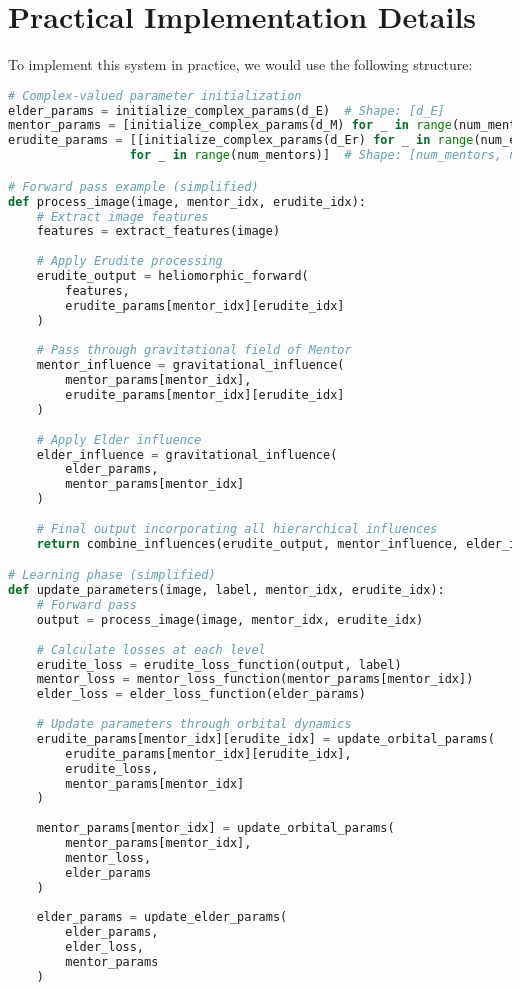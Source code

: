 \section{Practical Implementation Details}

To implement this system in practice, we would use the following structure:

\begin{lstlisting}[language=Python, caption=Simplified Python implementation of Elder system, label=lst:python_implementation]
# Complex-valued parameter initialization
elder_params = initialize_complex_params(d_E)  # Shape: [d_E]
mentor_params = [initialize_complex_params(d_M) for _ in range(num_mentors)]  # Shape: [num_mentors, d_M]
erudite_params = [[initialize_complex_params(d_Er) for _ in range(num_erudites_per_mentor)] 
                 for _ in range(num_mentors)]  # Shape: [num_mentors, num_erudites_per_mentor, d_Er]

# Forward pass example (simplified)
def process_image(image, mentor_idx, erudite_idx):
    # Extract image features
    features = extract_features(image)
    
    # Apply Erudite processing
    erudite_output = heliomorphic_forward(
        features, 
        erudite_params[mentor_idx][erudite_idx]
    )
    
    # Pass through gravitational field of Mentor
    mentor_influence = gravitational_influence(
        mentor_params[mentor_idx],
        erudite_params[mentor_idx][erudite_idx]
    )
    
    # Apply Elder influence
    elder_influence = gravitational_influence(
        elder_params,
        mentor_params[mentor_idx]
    )
    
    # Final output incorporating all hierarchical influences
    return combine_influences(erudite_output, mentor_influence, elder_influence)

# Learning phase (simplified)
def update_parameters(image, label, mentor_idx, erudite_idx):
    # Forward pass
    output = process_image(image, mentor_idx, erudite_idx)
    
    # Calculate losses at each level
    erudite_loss = erudite_loss_function(output, label)
    mentor_loss = mentor_loss_function(mentor_params[mentor_idx])
    elder_loss = elder_loss_function(elder_params)
    
    # Update parameters through orbital dynamics
    erudite_params[mentor_idx][erudite_idx] = update_orbital_params(
        erudite_params[mentor_idx][erudite_idx],
        erudite_loss,
        mentor_params[mentor_idx]
    )
    
    mentor_params[mentor_idx] = update_orbital_params(
        mentor_params[mentor_idx],
        mentor_loss,
        elder_params
    )
    
    elder_params = update_elder_params(
        elder_params,
        elder_loss,
        mentor_params
    )
\end{lstlisting}


